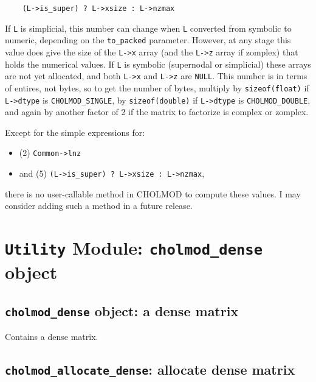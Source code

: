\documentclass[11pt]{article}
\begin{document}
\begin{enumerate}
\begin{verbatim}
    (L->is_super) ? L->xsize : L->nzmax
\end{verbatim}

If \verb'L' is simplicial, this number can change when \verb'L' converted from
symbolic to numeric, depending on the \verb'to_packed' parameter.  However, at
any stage this value does give the size of the \verb'L->x' array (and the
\verb'L->z' array if zomplex) that holds the numerical values.  If \verb'L' is
symbolic (supernodal or simplicial) these arrays are not yet allocated, and
both \verb'L->x' and \verb'L->z' are \verb'NULL'.  This number is in terms of
entires, not bytes, so to get the number of bytes, multiply by
\verb'sizeof(float)' if \verb'L->dtype' is \verb'CHOLMOD_SINGLE', by
\verb'sizeof(double)' if \verb'L->dtype' is \verb'CHOLMOD_DOUBLE', and again by
another factor of 2 if the matrix to factorize is complex or zomplex.

\end{enumerate}

Except for the simple expressions for:
\begin{itemize}
\item
(2) \verb'Common->lnz'
\item
and (5) \verb'(L->is_super) ? L->xsize : L->nzmax',
\end{itemize}
there is no user-callable method in CHOLMOD to compute these values.
I may consider adding such a method in a future release.

\newpage \section{{\tt Utility} Module: {\tt cholmod\_dense} object}
\label{cholmod_dense}

\subsection{{\tt cholmod\_dense} object: a dense matrix}


Contains a dense matrix.

\subsection{{\tt cholmod\_allocate\_dense}: allocate dense matrix}
\end{document}
